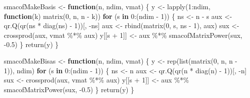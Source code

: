 \documentclass[
  12pt,
  letterpaper,
  DIV=11,
  numbers=noendperiod]{scrartcl}
\newenvironment{Shaded}{\begin{snugshade}}{\end{snugshade}}
\newcommand{\ControlFlowTok}[1]{\textcolor[rgb]{0.00,0.23,0.31}{\textbf{#1}}}
\newcommand{\DecValTok}[1]{\textcolor[rgb]{0.68,0.00,0.00}{#1}}
\newcommand{\FloatTok}[1]{\textcolor[rgb]{0.68,0.00,0.00}{#1}}
\newcommand{\FunctionTok}[1]{\textcolor[rgb]{0.28,0.35,0.67}{#1}}
\newcommand{\NormalTok}[1]{\textcolor[rgb]{0.00,0.23,0.31}{#1}}
\newcommand{\OtherTok}[1]{\textcolor[rgb]{0.00,0.23,0.31}{#1}}
\newcommand{\SpecialCharTok}[1]{\textcolor[rgb]{0.37,0.37,0.37}{#1}}
\begin{document}
\begin{Shaded}
\begin{Highlighting}[]
\NormalTok{smacofMakeBasis }\OtherTok{\textless{}{-}} \ControlFlowTok{function}\NormalTok{(n, ndim, vmat) \{}
\NormalTok{  y }\OtherTok{\textless{}{-}} \FunctionTok{lapply}\NormalTok{(}\DecValTok{1}\SpecialCharTok{:}\NormalTok{ndim, }\ControlFlowTok{function}\NormalTok{(k)}
    \FunctionTok{matrix}\NormalTok{(}\DecValTok{0}\NormalTok{, n, n }\SpecialCharTok{{-}}\NormalTok{ k))}
  \ControlFlowTok{for}\NormalTok{ (s }\ControlFlowTok{in} \DecValTok{0}\SpecialCharTok{:}\NormalTok{(ndim }\SpecialCharTok{{-}} \DecValTok{1}\NormalTok{)) \{}
\NormalTok{    ns }\OtherTok{\textless{}{-}}\NormalTok{ n }\SpecialCharTok{{-}}\NormalTok{ s}
\NormalTok{    aux }\OtherTok{\textless{}{-}} \FunctionTok{qr.Q}\NormalTok{(}\FunctionTok{qr}\NormalTok{(ns }\SpecialCharTok{*} \FunctionTok{diag}\NormalTok{(ns) }\SpecialCharTok{{-}} \DecValTok{1}\NormalTok{))[, }\SpecialCharTok{{-}}\NormalTok{ns]}
\NormalTok{    aux }\OtherTok{\textless{}{-}} \FunctionTok{rbind}\NormalTok{(}\FunctionTok{matrix}\NormalTok{(}\DecValTok{0}\NormalTok{, s, ns }\SpecialCharTok{{-}} \DecValTok{1}\NormalTok{), aux)}
\NormalTok{    sux }\OtherTok{\textless{}{-}} \FunctionTok{crossprod}\NormalTok{(aux, vmat }\SpecialCharTok{\%*\%}\NormalTok{ aux)}
\NormalTok{    y[[s }\SpecialCharTok{+} \DecValTok{1}\NormalTok{]] }\OtherTok{\textless{}{-}}\NormalTok{ aux }\SpecialCharTok{\%*\%} \FunctionTok{smacofMatrixPower}\NormalTok{(sux, }\SpecialCharTok{{-}}\FloatTok{0.5}\NormalTok{)}
\NormalTok{  \}}
  \FunctionTok{return}\NormalTok{(y)}
\NormalTok{\}}

\NormalTok{smacofMakeBisas }\OtherTok{\textless{}{-}} \ControlFlowTok{function}\NormalTok{(n, ndim, vmat) \{}
\NormalTok{  y }\OtherTok{\textless{}{-}} \FunctionTok{rep}\NormalTok{(}\FunctionTok{list}\NormalTok{(}\FunctionTok{matrix}\NormalTok{(}\DecValTok{0}\NormalTok{, n, n }\SpecialCharTok{{-}} \DecValTok{1}\NormalTok{)), ndim)}
  \ControlFlowTok{for}\NormalTok{ (s }\ControlFlowTok{in} \DecValTok{0}\SpecialCharTok{:}\NormalTok{(ndim }\SpecialCharTok{{-}} \DecValTok{1}\NormalTok{)) \{}
\NormalTok{    ns }\OtherTok{\textless{}{-}}\NormalTok{ n}
\NormalTok{    aux }\OtherTok{\textless{}{-}} \FunctionTok{qr.Q}\NormalTok{(}\FunctionTok{qr}\NormalTok{(n }\SpecialCharTok{*} \FunctionTok{diag}\NormalTok{(n) }\SpecialCharTok{{-}} \DecValTok{1}\NormalTok{))[, }\SpecialCharTok{{-}}\NormalTok{n]}
\NormalTok{    sux }\OtherTok{\textless{}{-}} \FunctionTok{crossprod}\NormalTok{(aux, vmat }\SpecialCharTok{\%*\%}\NormalTok{ aux)}
\NormalTok{    y[[s }\SpecialCharTok{+} \DecValTok{1}\NormalTok{]] }\OtherTok{\textless{}{-}}\NormalTok{ aux }\SpecialCharTok{\%*\%} \FunctionTok{smacofMatrixPower}\NormalTok{(sux, }\SpecialCharTok{{-}}\FloatTok{0.5}\NormalTok{)}
\NormalTok{  \}}
  \FunctionTok{return}\NormalTok{(y)}
\NormalTok{\}}


\end{Highlighting}
\end{Shaded}
\end{document}
